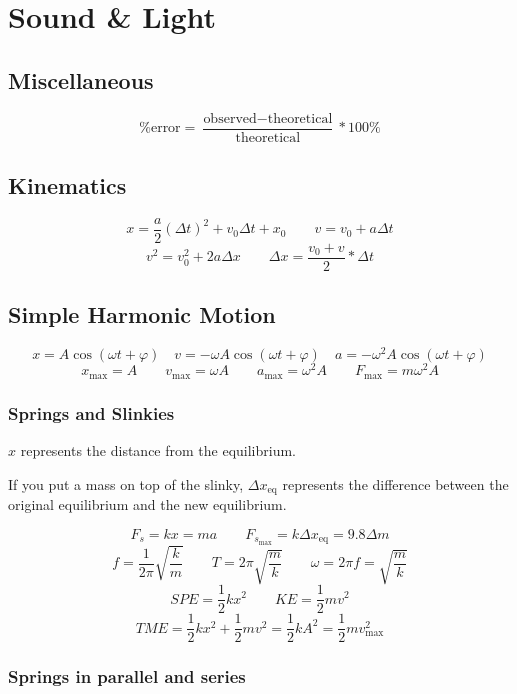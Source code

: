\chapter{Sound \& Light}

\section{Miscellaneous}

\[
	\text{\% error} = \frac{\text{observed} - \text{theoretical}}{\text{theoretical}} * 100\%
\]

\section{Kinematics}

\[
	x = \frac{a}{2}(\Delta t)^2 + v_0\Delta t + x_0 \qquad
	v = v_0 + a\Delta t
\]\[
	v^2 = v_0^2 + 2a\Delta x \qquad
	\Delta x = \frac{v_0 + v}{2} * \Delta t
\]

\section{Simple Harmonic Motion}

\[
	x = A \cos(\omega t + \varphi) \quad
	v = -\omega A \cos(\omega t + \varphi) \quad
	a = -\omega^2 A \cos(\omega t + \varphi)
\]
\[
	x_{\max} = A \qquad
	v_{\max} = \omega A \qquad
	a_{\max} = \omega^2 A \qquad
	F_{\max} = m\omega^2 A
\]

\subsection{Springs and Slinkies}

$x$ represents the distance from the equilibrium.

If you put a mass on top of the slinky, $\Delta x_\text{eq}$ represents the difference between the original equilibrium and the new equilibrium.

\[
	F_s = kx = ma \qquad
	F_{s_{\max}} = k\Delta x_\text{eq} = 9.8 \Delta m
\]
\[
	f = \frac{1}{2\pi}\sqrt{\frac{k}{m}} \qquad 
	T = 2\pi\sqrt{\frac{m}{k}} \qquad 
	\omega = 2\pi f = \sqrt{\frac{m}{k}}
\]
\[
	SPE = \frac{1}{2} kx^2 \qquad
	KE = \frac{1}{2} mv^2
\]
\[
	TME = \frac{1}{2} kx^2 + \frac{1}{2} mv^2 = \frac{1}{2} kA^2 = \frac{1}{2} mv_{\max}^2
\]

\subsection{Springs in parallel and series}

